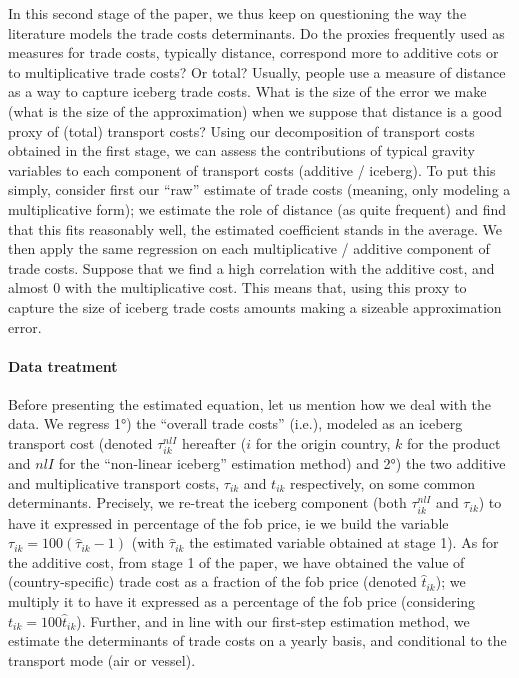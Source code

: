 \documentclass[a4paper,11pt]{article}
\begin{document}
In this second stage of the paper, we thus keep on questioning the way the literature models the trade costs determinants. Do the proxies frequently used as measures for trade costs, typically distance, correspond more to additive cots or to multiplicative trade costs? Or total? Usually, people use a measure of distance as a way to capture iceberg trade costs. What is the size of the error we make (what is the size of the approximation) when we suppose that distance is a good proxy of (total) transport costs? Using our decomposition of transport costs obtained in the first stage, we can assess the contributions of typical gravity variables to each component of transport costs (additive / iceberg). To put this simply, consider first our ``raw'' estimate of trade costs (meaning, only modeling a multiplicative form); we estimate the role of distance (as quite frequent) and find that this fits reasonably well, the estimated coefficient stands in the average. We then apply the same regression on each multiplicative / additive component of trade costs. Suppose that we find a high correlation with the additive cost, and almost 0 with the multiplicative cost. This means that, using this proxy to capture the size of iceberg trade costs amounts making a sizeable approximation error. \bigskip

\paragraph{Data treatment} Before presenting the estimated equation, let us mention how we deal with the data. We regress 1°) the ``overall trade costs'' (i.e.), modeled as an iceberg transport cost (denoted $\tau_{ik}^{nlI}$ hereafter ($i$ for the origin country, $k$ for the product and $nlI$ for the ``non-linear iceberg'' estimation method) and 2°) the two additive and multiplicative transport costs, $\tau_{ik}$ and $t_{ik}$ respectively, on some common determinants. Precisely, we re-treat the iceberg component (both $\tau_{ik}^{nlI}$ and $\tau_{ik}$) to have it expressed in percentage of the fob price, ie we build the variable $\tau_{ik} =  100(\widehat{\tau}_{ik}-1)$ (with $\widehat{\tau}_{ik}$ the estimated variable obtained at stage 1). As for the additive cost, from stage 1 of the paper, we have obtained the value of (country-specific) trade cost as a fraction of the fob price (denoted $\widehat{t}_{ik}$); we multiply it to have it expressed as a percentage of the fob price (considering $t_{ik} =  100 \widehat{t}_{ik}$). Further, and in line with our first-step estimation method, we estimate the determinants of trade costs on a yearly basis, and conditional to the transport mode (air or vessel).
\end{document}
